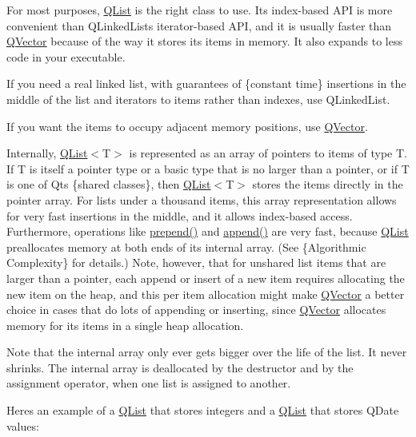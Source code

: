 \begin{DoxyItemize}
\item For most purposes, \hyperlink{class_q_list}{Q\+List} is the right class to use. Its index-\/based A\+PI is more convenient than Q\+Linked\+List\textquotesingle{}s iterator-\/based A\+PI, and it is usually faster than \hyperlink{class_q_vector}{Q\+Vector} because of the way it stores its items in memory. It also expands to less code in your executable. \item If you need a real linked list, with guarantees of \{constant time\} insertions in the middle of the list and iterators to items rather than indexes, use Q\+Linked\+List. \item If you want the items to occupy adjacent memory positions, use \hyperlink{class_q_vector}{Q\+Vector}. \end{DoxyItemize}
Internally, \hyperlink{class_q_list}{Q\+List}$<$T$>$ is represented as an array of pointers to items of type T. If T is itself a pointer type or a basic type that is no larger than a pointer, or if T is one of Qt\textquotesingle{}s \{shared classes\}, then \hyperlink{class_q_list}{Q\+List}$<$T$>$ stores the items directly in the pointer array. For lists under a thousand items, this array representation allows for very fast insertions in the middle, and it allows index-\/based access. Furthermore, operations like \hyperlink{class_q_list_a3d6003bfe5d2e7495df9dae2902743d0}{prepend()} and \hyperlink{class_q_list_a3a1e18c5fb9cc04324825a46540638c5}{append()} are very fast, because \hyperlink{class_q_list}{Q\+List} preallocates memory at both ends of its internal array. (See \{Algorithmic Complexity\} for details.) Note, however, that for unshared list items that are larger than a pointer, each append or insert of a new item requires allocating the new item on the heap, and this per item allocation might make \hyperlink{class_q_vector}{Q\+Vector} a better choice in cases that do lots of appending or inserting, since \hyperlink{class_q_vector}{Q\+Vector} allocates memory for its items in a single heap allocation.

Note that the internal array only ever gets bigger over the life of the list. It never shrinks. The internal array is deallocated by the destructor and by the assignment operator, when one list is assigned to another.

Here\textquotesingle{}s an example of a \hyperlink{class_q_list}{Q\+List} that stores integers and a \hyperlink{class_q_list}{Q\+List} that stores Q\+Date values\+:


